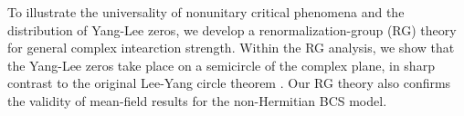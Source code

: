 \documentclass[aps,prl,twocolumn,nofootinbib,superscriptaddress,notitlepage,longbibliography]{revtex4-1}
\begin{document}
	To illustrate the universality of nonunitary critical phenomena and the distribution of Yang-Lee zeros, we develop a %
	renormalization-group (RG) theory for general complex intearction strength. Within the %
	RG analysis, we show that the Yang-Lee zeros  take place on a semicircle of the complex plane, in sharp contrast to the original Lee-Yang circle theorem \cite{PhysRev.87.404,PhysRev.87.410}. Our RG theory also %
	confirms the validity of mean-field results for the non-Hermitian BCS model. %
\end{document}
